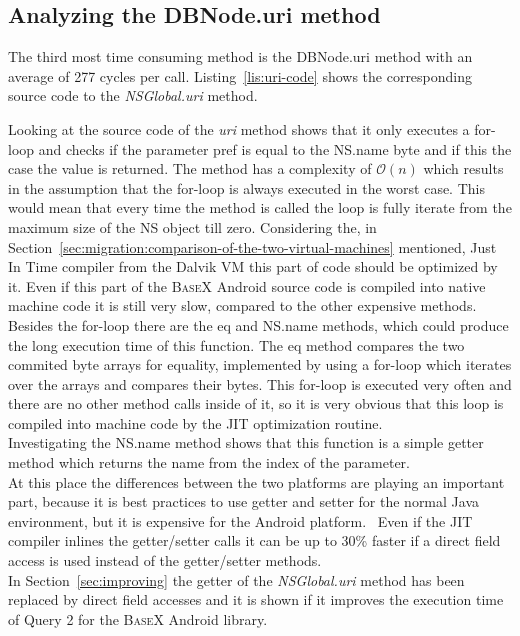 \subsection*{Analyzing the \textsf{DBNode.uri} method}
\label{sec:analyzing-the-dbnode.uri-method}
The third most time consuming method is the \textsf{DBNode.uri} method with an average of 277 cycles per call.
Listing~\ref{lis:uri-code} shows the corresponding source code to the \textit{NSGlobal.uri} method.
		
Looking at the source code of the \textit{uri} method shows that it only executes a for-loop and checks if the parameter \textsf{pref} is equal to the \textsf{NS.name} byte and if this the case the value is returned.
The method has a complexity of $\mathcal O(n)$ which results in the assumption that the for-loop is always executed in the worst case.
This would mean that every time the method is called the loop is fully iterate from the maximum size of the \textsf{NS} object till zero.
Considering the, in Section~\ref{sec:migration:comparison-of-the-two-virtual-machines} mentioned, Just In Time compiler from the Dalvik VM this part of code should be optimized by it.
Even if this part of the \textsc{BaseX} Android source code is compiled into native machine code it is still very slow, compared to the other expensive methods.
Besides the for-loop there are the \textsf{eq} and \textsf{NS.name} methods, which could produce the long execution time of this function.
The \textsf{eq} method compares the two commited byte arrays for equality, implemented by using a for-loop which iterates over the arrays and compares their bytes.
This for-loop is executed very often and there are no other method calls inside of it, so it is very obvious that this loop is compiled into machine code by the JIT optimization routine.\\
Investigating the \textsf{NS.name} method shows that this function is a simple getter method which returns the name from the index of the parameter.\\
At this place the differences between the two platforms are playing an important part, because it is best practices to use getter and setter for the normal Java environment, but it is expensive for the Android platform.~\cite{toninievlautatingandroid}
Even if the JIT compiler inlines the getter/setter calls it can be up to 30\% faster if a direct field access is used instead of the getter/setter methods.~\cite{toninianalysis}\\
In Section~\ref{sec:improving} the getter of the \textit{NSGlobal.uri} method has been replaced by direct field accesses and it is shown if it improves the execution time of Query 2 for the \textsc{BaseX} Android library.


